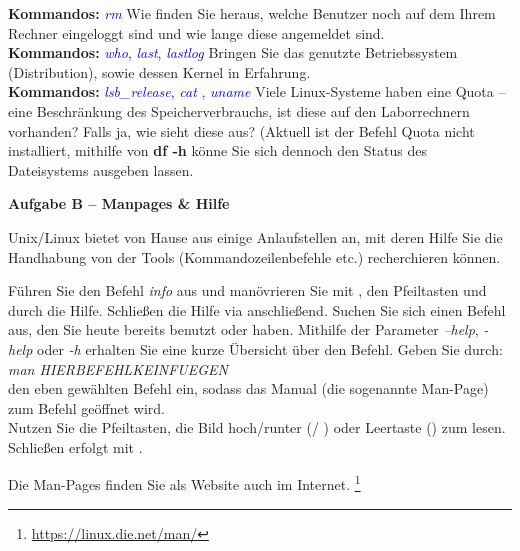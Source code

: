 \documentclass[paper=a4,fontsize=11pt]{scrartcl}%
\numberwithin{equation}{section}
\begin{document}
\begin{enumerate}
\begin{tasks}
          \textbf{Kommandos:} \textcolor{blue}{\emph{rm}}
          \task Wie finden Sie heraus, welche Benutzer noch auf dem Ihrem Rechner eingeloggt sind und wie lange diese angemeldet sind.\\
          \textbf{Kommandos:} \textcolor{blue}{\emph{who}, \emph{last}, \emph{lastlog}}
          \task Bringen Sie das genutzte Betriebssystem (Distribution), sowie dessen Kernel in Erfahrung.\\
          \textbf{Kommandos:} \textcolor{blue}{\emph{lsb\_release}, \emph{cat }, \emph{uname}}
          \task Viele Linux-Systeme haben eine Quota -- eine Beschränkung des Speicherverbrauchs, ist diese auf den Laborrechnern vorhanden? Falls ja, wie sieht diese aus? (Aktuell ist der Befehl Quota nicht installiert, mithilfe von \textbf{df -h} könne Sie sich dennoch den Status des Dateisystems ausgeben lassen.
        \end{tasks}
\end{enumerate}

\begin{center}\Large{\textbf{Aufgabe B -- Manpages \& Hilfe}}\end{center}\vskip0.25in
Unix/Linux bietet von Hause aus einige Anlaufstellen an, mit deren Hilfe Sie die Handhabung von der Tools (Kommandozeilenbefehle etc.) recherchieren können.
\begin{tasks}
	\task Führen Sie den Befehl \emph{info} aus und manövrieren Sie mit \keys{\tab}, den Pfeiltasten und \keys{\return} durch die Hilfe. Schließen die Hilfe via  anschließend.
	\task Suchen Sie sich einen Befehl aus, den Sie heute bereits benutzt oder haben. Mithilfe der Parameter \emph{--help}, \emph{-help} oder \emph{-h} erhalten Sie eine kurze Übersicht über den Befehl.
    \task Geben Sie durch: \\
    		\emph{man HIERBEFEHLKEINFUEGEN}\\
		den eben gewählten Befehl ein, sodass das Manual (die sogenannte Man-Page) zum Befehl geöffnet wird.\\
		 Nutzen Sie die Pfeiltasten, die Bild hoch/runter (/ ) oder Leertaste (\keys{\Space}) zum lesen. Schließen erfolgt mit .
\end{tasks}
Die Man-Pages finden Sie als Website auch im Internet. \footnote{\url{https://linux.die.net/man/}}
\end{document}
